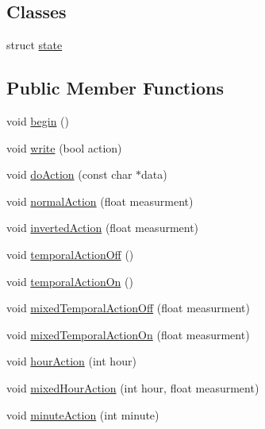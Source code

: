 \subsection*{Classes}
\begin{DoxyCompactItemize}
\item 
struct \hyperlink{class_cool_board_actor_d5/ddc/struct_cool_board_actor_1_1state}{state}
\end{DoxyCompactItemize}
\subsection*{Public Member Functions}
\begin{DoxyCompactItemize}
\item 
void \hyperlink{class_cool_board_actor_a7f4422fd85a5510bc2cdfd68e109be5e}{begin} ()
\item 
void \hyperlink{class_cool_board_actor_a958786ff01ea1056ee72c72d439f86da}{write} (bool action)
\item 
void \hyperlink{class_cool_board_actor_a96a45658d32c6b95caa2f385c7da32cd}{do\+Action} (const char $\ast$data)
\item 
void \hyperlink{class_cool_board_actor_a81229abf5895f4d3b0355050b822b438}{normal\+Action} (float measurment)
\item 
void \hyperlink{class_cool_board_actor_aae82b2e62f91be009d40f93c206f9bda}{inverted\+Action} (float measurment)
\item 
void \hyperlink{class_cool_board_actor_a02698bd647df49cabbe74513d4d88918}{temporal\+Action\+Off} ()
\item 
void \hyperlink{class_cool_board_actor_ada603785c203fdb0b41cc967d70bdc4d}{temporal\+Action\+On} ()
\item 
void \hyperlink{class_cool_board_actor_a00b29c4abf0388551aa6812372113cf1}{mixed\+Temporal\+Action\+Off} (float measurment)
\item 
void \hyperlink{class_cool_board_actor_a216aa7a0cfd1f31d0025cc91c2ecd5dd}{mixed\+Temporal\+Action\+On} (float measurment)
\item 
void \hyperlink{class_cool_board_actor_adf3b4e15b9d73681082112adf8ef95cb}{hour\+Action} (int hour)
\item 
void \hyperlink{class_cool_board_actor_a6d93a24502c56ced2ef7675c913a276b}{mixed\+Hour\+Action} (int hour, float measurment)
\item 
void \hyperlink{class_cool_board_actor_af000944ce0b9abb9c6ee4b8fe839fb36}{minute\+Action} (int minute)
\item 

\end{DoxyCompactItemize}
